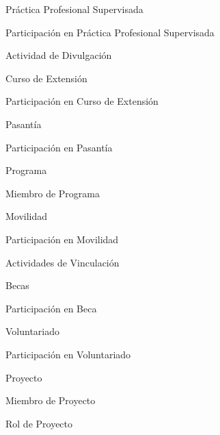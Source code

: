     \item Práctica Profesional Supervisada
    \item Participación en Práctica Profesional Supervisada
    \item Actividad de Divulgación
    \item Curso de Extensión
    \item Participación en Curso de Extensión
    \item Pasantía
    \item Participación en Pasantía
    \item Programa
    \item Miembro de Programa
    \item Movilidad
    \item Participación en Movilidad
    \item Actividades de Vinculación
    \item Becas
    \item Participación en Beca
    \item Voluntariado
    \item Participación en Voluntariado
    \item Proyecto
    \item Miembro de Proyecto
    \item Rol de Proyecto
